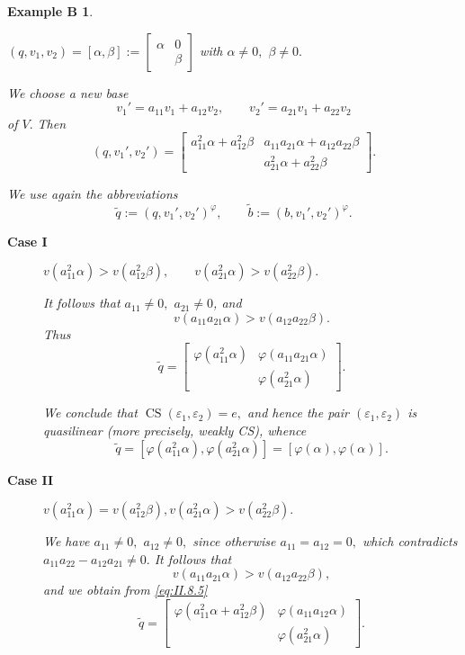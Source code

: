 \documentclass [12pt,a4paper,reqno]{amsart}
\newtheorem*{exampleB*}{Example B}
\begin{document}
\begin{exampleB*} $ $

$(q,v_1,v_2)=[{\alpha},{\beta}]:=\begin{bmatrix} {\alpha} & 0\\  &{\beta}\end{bmatrix}$ with ${\alpha}\ne0,$ ${\beta}\ne0.$

We choose a new base
$$v_1'=a_{11}v_1+a_{12} v_2,\qquad v_2'=a_{21}v_1+a_{22}v_2$$
of $V.$ Then
\begin{equation}\label{eq:II.8.5}
(q,v_1',v_2')=\begin{bmatrix} a_{11}^2 {\alpha} +a_{12}^2{\beta}& a_{11}a_{21}{\alpha}+a_{12}a_{22}{\beta}\\
 & a_{21}^2{\alpha}+a_{22}^2{\beta}\end{bmatrix}.
\end{equation}

We use again the abbreviations
$${\tilde q}:=(q,v_1',v_2')^{\varphi},\qquad{\tilde b}:=(b,v_1',v_2')^{\varphi}.$$

\begin{description}

\item[\textbf{Case I}] $v(a_{11}^2{\alpha})>v(a_{12}^2{\beta}),\qquad v(a_{21}^2{\alpha})>v(a_{22}^2{\beta}).$

It follows that $a_{11}\ne0,$ $a_{21}\ne0$, and
$$v(a_{11}a_{21}{\alpha})>v(a_{12}a_{22}{\beta}).$$
Thus
$${\tilde q}=\begin{bmatrix}{\varphi}(a_{11}^2{\alpha})& {\varphi}(a_{11}a_{21}{\alpha})\\  & {\varphi}(a_{21}^2{\alpha})
\end{bmatrix}.$$

We conclude that ${\operatorname{CS}}({\varepsilon}_1,{\varepsilon}_2)=e,$ and hence the pair $({\varepsilon}_1,{\varepsilon}_2)$ is quasilinear (more precisely, weakly CS), whence
\begin{equation}\label{eq:II.8.6}
{\tilde q}=[{\varphi}(a_{11}^2{\alpha}),{\varphi}(a_{21}^2{\alpha})]=[{\varphi}({\alpha}),{\varphi}({\alpha})].
\end{equation}

{\vskip 1.5mm \noindent}

\item[\textbf{Case II}] $v(a_{11}^2{\alpha})=v(a_{12}^2{\beta}),$\qquad $v(a_{21}^2{\alpha})>v(a_{22}^2{\beta}).$

We have $a_{11}\ne0,$ $a_{12}\ne0,$ since otherwise $a_{11}=a_{12}=0,$ which contradicts $a_{11}a_{22}-a_{12}a_{21}\ne0.$
It follows that
$$v(a_{11}a_{21}{\alpha})>v(a_{12}a_{22}{\beta}),$$
and we obtain from \eqref{eq:II.8.5}
$${\tilde q}=\begin{bmatrix}{\varphi}(a_{11}^2{\alpha} + a_{12}^2{\beta}) & {\varphi}(a_{11}a_{12}{\alpha})\\  & {\varphi}(a_{21}^2{\alpha})\end{bmatrix}.$$


\end{description}
\end{exampleB*}
\end{document}

